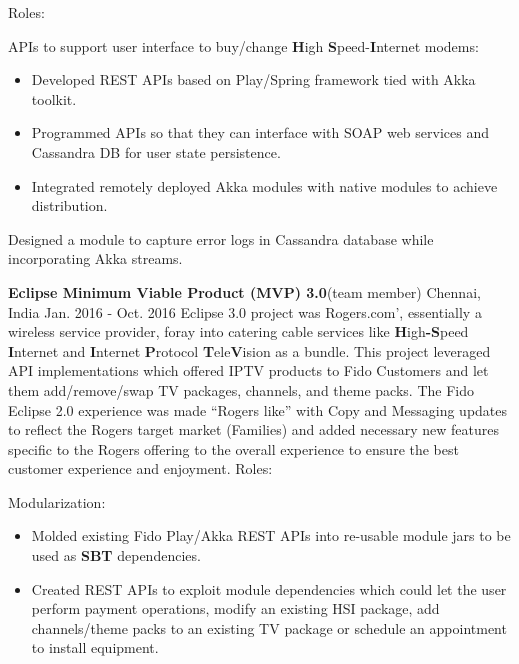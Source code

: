 \begin{cventries}
    {Roles:}
    {
      \begin{cvitems}
        \item {APIs to support user interface to buy/change \textbf{H}igh \textbf{S}peed-\textbf{I}nternet modems:}
\begin{itemize}
\item Developed REST APIs based on Play/Spring framework tied with Akka toolkit.
\end{itemize}
\begin{itemize}
\item Programmed APIs so that they can interface with SOAP web services and Cassandra DB for user state persistence.
\end{itemize}
\begin{itemize}
\item Integrated remotely deployed Akka modules with native modules to achieve distribution. 
\end{itemize}
        \item {Designed a module to capture error logs in Cassandra database while incorporating Akka streams.}
             \end{cvitems}
    }
 \experienceentry
    {\textbf{Eclipse Minimum Viable Product (MVP) 3.0}(team member)}
    {}
    {Chennai, India}
    {Jan. 2016 - Oct. 2016}
    {Eclipse 3.0 project was Rogers.com', essentially a wireless service provider, foray into catering cable services like \textbf{H}igh\textbf{-}\textbf{S}peed \textbf{I}nternet and \textbf{I}nternet \textbf{P}rotocol \textbf{T}ele\textbf{V}ision as a bundle. This project leveraged API implementations which offered IPTV products to Fido Customers and let them add/remove/swap TV packages, channels, and theme packs. The Fido Eclipse 2.0 experience was made “Rogers like” with Copy and Messaging updates to reflect the Rogers target market (Families) and added necessary new features specific to the Rogers offering to the overall experience to ensure the best customer experience and enjoyment.
}
    {Roles:}
    {
      \begin{cvitems}
        \item {Modularization:}
        \begin{itemize}
\item Molded existing Fido Play/Akka REST APIs into re-usable module jars to be used as \textbf{SBT} dependencies.
\end{itemize}
\begin{itemize}
\item Created REST APIs to exploit module dependencies which could let the user perform payment operations, modify an existing HSI package, add channels/theme packs to an existing TV package or schedule an appointment to install equipment.

\end{itemize}
\end{cvitems}}
\end{cventries}
